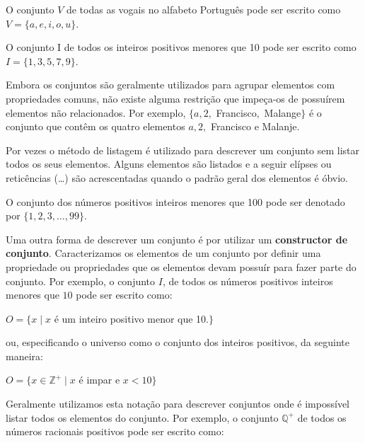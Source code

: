 \label{exem31}
\begin{exmp}
O conjunto $V$ de todas as vogais no alfabeto Português pode ser escrito como $V
= \{a,e,i,o,u\}$.
\end{exmp}
\label{exem32}
\begin{exmp}
O conjunto I de todos os inteiros positivos menores que 10 pode ser escrito como
$I=\{1,3,5,7,9\}$.
\end{exmp}
\label{exem33}
\begin{exmp}
Embora os conjuntos são geralmente utilizados para agrupar elementos com
propriedades comuns, não existe alguma restrição que impeça-os de possuírem
elementos não relacionados. Por exemplo, $\{a, 2,$ Francisco$,$ Malange$\}$ é o
conjunto que contêm os quatro elementos $a, 2,$ Francisco e Malanje.
\end{exmp}

Por vezes o método de listagem é utilizado para descrever um conjunto sem listar
todos os seus elementos. Alguns elementos são listados e a seguir elípses ou
reticências (\ldots) são acrescentadas quando o padrão geral dos elementos é
óbvio.

\label{exem34}
\begin{exmp}
O conjunto dos números positivos inteiros menores que 100 pode ser denotado por
$\{1,2,3,\ldots,99\}$.
\end{exmp}

Uma outra forma de descrever um conjunto é por utilizar um \textbf{constructor
de conjunto}. Caracterizamos os elementos de um conjunto por definir uma
propriedade ou propriedades que os elementos devam possuír para fazer parte do
conjunto. Por exemplo, o conjunto $I$, de todos os números positivos inteiros
menores que $10$ pode ser escrito como:

\begin{center}$O = \{x \mid x$ é um inteiro positivo menor que 10.$\}$\end{center}

\noindent ou, especificando o universo como o conjunto dos inteiros positivos,
da seguinte maneira:

\begin{center}$O = \{x \in \mathbb{Z}^{+} \mid x$ é impar e $x < 10\}$\end{center}

Geralmente utilizamos esta notação para descrever conjuntos onde é impossível
listar todos os elementos do conjunto. Por exemplo, o conjunto $\mathbb{Q}^{+}$
de todos os números racionais positivos pode ser escrito como:

